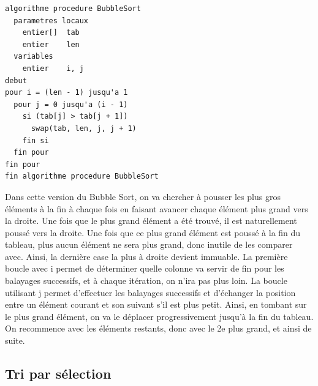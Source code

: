 \documentclass[11pt,a4paper]{article}
\begin{document}
\clearpage

\vfillFirst


\begin{table}[ht!]
  \centering
\begin{lstlisting}[style=algorithmique]
algorithme procedure BubbleSort
  parametres locaux
    entier[]  tab
    entier    len
  variables
    entier    i, j
debut
pour i = (len - 1) jusqu'a 1
  pour j = 0 jusqu'a (i - 1)
    si (tab[j] > tab[j + 1])
      swap(tab, len, j, j + 1)
    fin si
  fin pour
fin pour
fin algorithme procedure BubbleSort \end{lstlisting}
\end{table}


Dans cette version du Bubble Sort, on va chercher à pousser les plus gros éléments à la fin à chaque fois en faisant avancer chaque élément plus grand vers la droite.
Une fois que le plus grand élément a été trouvé, il est naturellement poussé vers la droite.
Une fois que ce plus grand élément est poussé à la fin du tableau, plus aucun élément ne sera plus grand, donc inutile de les comparer avec.
Ainsi, la dernière case la plus à droite devient immuable.
La première boucle avec i permet de déterminer quelle colonne va servir de fin pour les balayages successifs, et à chaque itération, on n'ira pas plus loin.
La boucle utilisant j permet d'effectuer les balayages successifs et d'échanger la position entre un élément courant et son suivant s'il est plus petit.
Ainsi, en tombant sur le plus grand élément, on va le déplacer progressivement jusqu'à la fin du tableau. On recommence avec les éléments restants, donc avec le 2e plus grand, et ainsi de suite.

\vfillLast


\newpage


\subsection{Tri par sélection}
\end{document}
